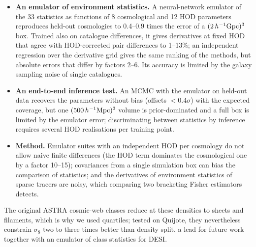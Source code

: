 \begin{itemize}
\item \textbf{An emulator of environment statistics.} A neural-network emulator of the 33 statistics as functions of 8 cosmological and 12 HOD parameters reproduces held-out cosmologies to 0.4--0.9 times the error of a $(2\,h^{-1}{\rm Gpc})^3$ box. Trained also on catalogue differences, it gives derivatives at fixed HOD that agree with HOD-corrected pair differences to 1--13\%; an independent regression over the derivative grid gives the same ranking of the methods, but absolute errors that differ by factors 2--6. Its accuracy is limited by the galaxy sampling noise of single catalogues.
\item \textbf{An end-to-end inference test.} An MCMC with the emulator on held-out data recovers the parameters without bias (offsets $<0.4\sigma$) with the expected coverage, but one $(500\,h^{-1}\mathrm{Mpc})^3$ volume is prior-dominated and a full box is limited by the emulator error; discriminating between statistics by inference requires several HOD realisations per training point.
\item \textbf{Method.} Emulator suites with an independent HOD per cosmology do not allow naive finite differences (the HOD term dominates the cosmological one by a factor 10--15); covariances from a single simulation box can bias the comparison of statistics; and the derivatives of environment statistics of sparse tracers are noisy, which comparing two bracketing Fisher estimators detects.
\end{itemize}
The original ASTRA cosmic-web classes reduce at these densities to sheets and filaments, which is why we used quartiles; tested on Quijote, they nevertheless constrain $\sigma_8$ two to three times better than density split, a lead for future work together with an emulator of class statistics for DESI.
